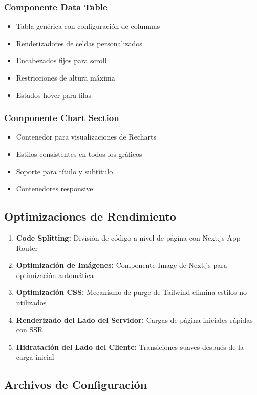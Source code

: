 \documentclass[12pt,a4paper]{article}
\begin{document}
\subsubsection{Componente Data Table}
\begin{itemize}
    \item Tabla genérica con configuración de columnas
    \item Renderizadores de celdas personalizados
    \item Encabezados fijos para scroll
    \item Restricciones de altura máxima
    \item Estados hover para filas
\end{itemize}

\subsubsection{Componente Chart Section}
\begin{itemize}
    \item Contenedor para visualizaciones de Recharts
    \item Estilos consistentes en todos los gráficos
    \item Soporte para título y subtítulo
    \item Contenedores responsive
\end{itemize}

\subsection{Optimizaciones de Rendimiento}

\begin{enumerate}
    \item \textbf{Code Splitting:} División de código a nivel de página con Next.js App Router
    \item \textbf{Optimización de Imágenes:} Componente Image de Next.js para optimización automática
    \item \textbf{Optimización CSS:} Mecanismo de purge de Tailwind elimina estilos no utilizados
    \item \textbf{Renderizado del Lado del Servidor:} Cargas de página iniciales rápidas con SSR
    \item \textbf{Hidratación del Lado del Cliente:} Transiciones suaves después de la carga inicial
\end{enumerate}

\subsection{Archivos de Configuración}
\end{document}
